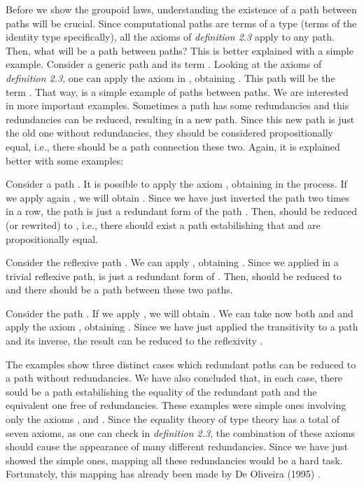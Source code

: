 \documentclass{entcs} \usepackage{entcsmacro}
\begin{document}
Before we show the groupoid laws, understanding the existence of a path between paths will be crucial. Since computational paths are terms of a type (terms of the identity type specifically), all the axioms of \emph{definition 2.3} apply to any path. Then, what will be a path between paths? This is better explained with a simple example. Consider a generic path   and its term . Looking at the axioms of \emph{definition 2.3}, one can apply the axiom  in , obtaining . This path will be the term . That way,  is a simple example of paths between paths. We are interested in more important examples. Sometimes a path has some redundancies and this redundancies can be reduced, resulting in a new path. Since this new path is just the old one without redundancies, they should be considered propositionally equal, i.e., there should be a path connection these two. Again, it is explained better with some examples: 


\begin{example}
Consider a path . It is possible to apply the axiom , obtaining  in the process. If we apply again , we will obtain . Since we have just inverted the path two times in a row, the path  is just a redundant form of the path . Then,  should be reduced (or rewrited) to , i.e., there should exist a path estabilishing that  and  are propositionally equal. 
\end{example}

\begin{example}
Consider the reflexive path . We can apply , obtaining . Since we applied  in a trivial reflexive path,  is just a redundant form of . Then,  should be reduced to  and there should be a path between these two paths.
\end{example}

\begin{example}
Consider the path . If we apply , we will obtain . We can take now both  and  and apply the axiom , obtaining . Since we have just applied the transitivity to a path and its inverse, the result can be reduced to the reflexivity .
\end{example}

The examples show three distinct cases which redundant paths can be reduced to a path without redundancies. We have also concluded that, in each case, there sould be a path estabilishing the equality of the redundant path and the equivalent one free of redundancies. These examples were simple ones involving only the axioms ,  and . Since the equality theory of type theory has a total of seven axioms, as one can check in \emph{definition 2.3}, the combination of these axioms should cause the appearance of many different redundancies. Since we have just showed the simple ones, mapping all these redundancies would be a hard task. Fortunately, this mapping has already been made by De Oliveira (1995) \cite{Anjo1}.
\end{document}
